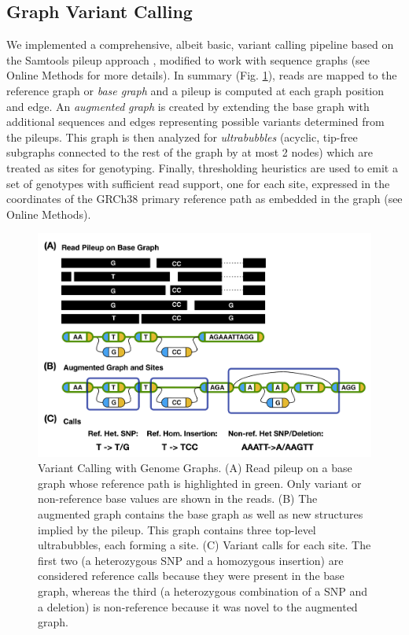 \subsection{Graph Variant Calling}

We implemented a comprehensive, albeit basic, variant calling pipeline
based on the Samtools pileup approach \cite{Li2009-je}, modified to work
with sequence graphs (see Online Methods for more details). In summary
(Fig. \ref{fig:bakeoff:calling}), reads are mapped to the reference graph or \emph{base graph}
and a pileup is computed at each graph position and edge. An
\emph{augmented} \emph{graph} is created by extending the base graph
with additional sequences and edges representing possible variants
determined from the pileups. This graph is then analyzed for
\emph{ultrabubbles} (acyclic, tip-free subgraphs connected to the rest
of the graph by at most 2 nodes) which are treated as sites for
genotyping\cite{paten2017superbubbles}. Finally, thresholding heuristics
are used to emit a set of genotypes with sufficient read support, one
for each site, expressed in the coordinates of the GRCh38 primary
reference path as embedded in the graph (see Online Methods).

\begin{figure}[htbp]
\centering
\includegraphics[width=\textwidth]{figures/04_bakeoff/figure03.png}
\caption[Variant calling with genome graphs]{Variant Calling with Genome Graphs. (A) Read pileup on a base
graph whose reference path is highlighted in green. Only variant or
non-reference base values are shown in the reads. (B) The augmented
graph contains the base graph as well as new structures implied by the
pileup. This graph contains three top-level ultrabubbles, each forming a
site. (C) Variant calls for each site. The first two (a heterozygous SNP
and a homozygous insertion) are considered reference calls because they
were present in the base graph, whereas the third (a heterozygous
combination of a SNP and a deletion) is non-reference because it was
novel to the augmented graph.}
\label{fig:bakeoff:calling}
\end{figure}

